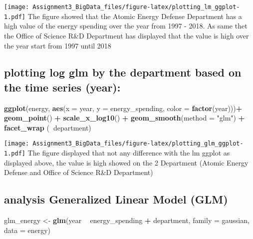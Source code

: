 \documentclass[]{article}
\newenvironment{Shaded}{\begin{snugshade}}{\end{snugshade}}
\newcommand{\KeywordTok}[1]{\textcolor[rgb]{0.13,0.29,0.53}{\textbf{#1}}}
\newcommand{\DataTypeTok}[1]{\textcolor[rgb]{0.13,0.29,0.53}{#1}}
\newcommand{\StringTok}[1]{\textcolor[rgb]{0.31,0.60,0.02}{#1}}
\newcommand{\OperatorTok}[1]{\textcolor[rgb]{0.81,0.36,0.00}{\textbf{#1}}}
\newcommand{\NormalTok}[1]{#1}
\begin{document}
\texttt{[image: Assignment3\_BigData\_files/figure-latex/plotting\_lm\_ggplot-1.pdf]}
The figure showed that the Atomic Energy Defense Department has a high
value of the energy spending over the year from 1997 - 2018. As same
thet the Office of Science R\&D Department has displayed that the value
is high over the year start from 1997 until 2018

\subsection{plotting log glm by the department based on the time series
(year):}\label{plotting-log-glm-by-the-department-based-on-the-time-series-year-1}

\begin{Shaded}
\begin{Highlighting}[]
\KeywordTok{ggplot}\NormalTok{(energy, }\KeywordTok{aes}\NormalTok{(}\DataTypeTok{x =}\NormalTok{ year, }\DataTypeTok{y =}\NormalTok{ energy_spending, }\DataTypeTok{color =} \KeywordTok{factor}\NormalTok{(year)))}\OperatorTok{+}
\StringTok{  }\KeywordTok{geom_point}\NormalTok{() }\OperatorTok{+}\StringTok{ }\KeywordTok{scale_x_log10}\NormalTok{() }\OperatorTok{+}\StringTok{ }\KeywordTok{geom_smooth}\NormalTok{(}\DataTypeTok{method =} \StringTok{"glm"}\NormalTok{) }\OperatorTok{+}\StringTok{ }\KeywordTok{facet_wrap}\NormalTok{ (}\OperatorTok{~}\NormalTok{department)}
\end{Highlighting}
\end{Shaded}

\texttt{[image: Assignment3\_BigData\_files/figure-latex/plotting\_glm\_ggplot-1.pdf]}
The figure displayed that not any difference with the lm ggplot as
displayed above, the value is high showed on the 2 Department (Atomic
Energy Defense and Office of Science R\&D Department)

\subsection{analysis Generalized Linear Model
(GLM)}\label{analysis-generalized-linear-model-glm-1}

\begin{Shaded}
\begin{Highlighting}[]
\NormalTok{glm_energy <-}\StringTok{ }\KeywordTok{glm}\NormalTok{(year }\OperatorTok{~}\StringTok{ }\NormalTok{energy_spending }\OperatorTok{+}\StringTok{ }\NormalTok{department, }\DataTypeTok{family =}\NormalTok{ gaussian, }\DataTypeTok{data =}\NormalTok{ energy)}
\end{Highlighting}
\end{Shaded}
\end{document}
